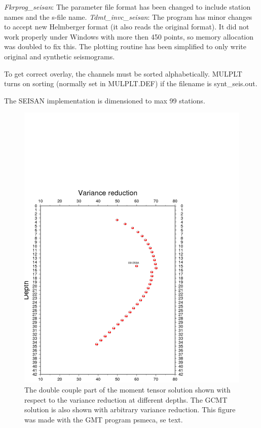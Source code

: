 \textit{Fkrprog\_seisan}: The parameter file format has been changed to include station names and the s-file name.\newline
\textit{Tdmt\_invc\_seisan}: The program has minor changes to accept new Helmberger format (it also reads the original format). It did not work properly under Windows with more then 450 points, so memory allocation was doubled to fix this. The plotting routine has been simplified to only write original and synthetic seismograms.

To get correct overlay, the channels must be sorted alphabetically. MULPLT turns on sorting (normally set in MULPLT.DEF) if the filename is synt\_seis.out.
 

The SEISAN implementation is dimensioned to max 99 stations.

\begin{figure}
\centerline{\includegraphics[width=0.9\linewidth]{fig/mt-depth}}
\caption{The double couple part of the moment tensor solution shown with respect to the 
variance reduction at different depths. The GCMT solution is also shown with 
arbitrary variance reduction. This figure was made with the GMT program psmeca, se text.}
\label{fig:mt-depth}
\end{figure}


